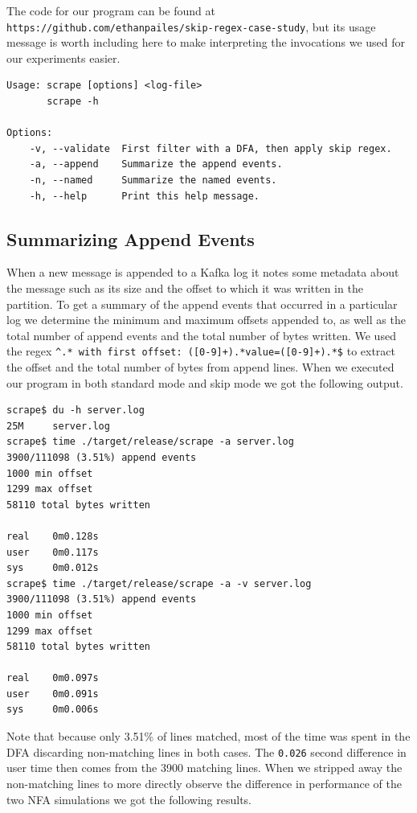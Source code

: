 The code for our program can be found at
\verb'https://github.com/ethanpailes/skip-regex-case-study',
but its usage message is worth including here to make
interpreting the invocations we used for our experiments
easier.

\begin{verbatim}
Usage: scrape [options] <log-file>
       scrape -h

Options:
    -v, --validate  First filter with a DFA, then apply skip regex.
    -a, --append    Summarize the append events.
    -n, --named     Summarize the named events.
    -h, --help      Print this help message.
\end{verbatim}

\subsection{Summarizing Append Events}

When a new message is appended to a Kafka log it notes some
metadata about the message such as its size and the offset to
which it was written in the partition. To get a summary of
the append events that occurred in a particular log we 
determine the minimum and maximum offsets appended to,
as well as the total number of append events and the total
number of bytes written. We used the regex
\verb'^.* with first offset: ([0-9]+).*value=([0-9]+).*$'
to extract the offset and the total number of bytes from append
lines. When we executed our program in both standard mode
and skip mode we got the following output.

\begin{verbatim}
scrape$ du -h server.log
25M     server.log
scrape$ time ./target/release/scrape -a server.log 
3900/111098 (3.51%) append events
1000 min offset
1299 max offset
58110 total bytes written

real    0m0.128s
user    0m0.117s
sys     0m0.012s
scrape$ time ./target/release/scrape -a -v server.log 
3900/111098 (3.51%) append events
1000 min offset
1299 max offset
58110 total bytes written

real    0m0.097s
user    0m0.091s
sys     0m0.006s
\end{verbatim}

Note that because only 3.51\% of lines matched, most of the time
was spent in the DFA discarding non-matching lines in both cases.
The \verb'0.026' second difference in user time then comes from
the 3900 matching lines. When we stripped away the non-matching
lines to more directly observe the difference in performance
of the two NFA simulations we got the following results.

